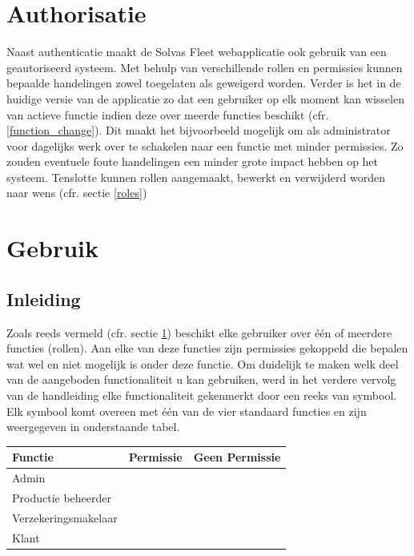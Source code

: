 \documentclass[11pt,openany]{article}
\newcommand{\cmark}{\ding{51}}%
\newcommand{\xmark}{\ding{55}}%
\newcommand{\done}{\rlap{$\square$}{\raisebox{2pt}{\large\hspace{1pt}\cmark}}%
	\hspace{-2.5pt}}
\newcommand{\wontfix}{\rlap{$\square$}{\large\hspace{1pt}\xmark}}
\begin{document}
\newpage
\section{Authorisatie}
 
\label{authorisation}
Naast authenticatie maakt de Solvas Fleet webapplicatie ook gebruik van een geautoriseerd systeem. 
Met behulp van verschillende rollen en permissies kunnen bepaalde handelingen zowel toegelaten als geweigerd worden.
Verder is het in de huidige versie van de applicatie zo dat een gebruiker op elk moment kan wisselen van actieve functie
indien deze over meerde functies beschikt (cfr. \ref{function_change}). Dit maakt het bijvoorbeeld mogelijk om als administrator voor dagelijks werk over te schakelen naar een functie met minder permissies. Zo zouden eventuele foute handelingen een minder
grote impact hebben op het systeem. Tenslotte kunnen rollen aangemaakt, bewerkt en verwijderd worden naar wens (cfr. sectie \ref{roles})
\section{Gebruik}
\subsection{Inleiding}

Zoals reeds vermeld (cfr. sectie \ref{authorisation}) beschikt elke gebruiker over \'{e}\'{e}n of meerdere functies (rollen). Aan elke van
deze functies zijn permissies gekoppeld die bepalen wat wel en niet mogelijk is onder deze functie. Om duidelijk te maken welk deel van de aangeboden functionaliteit u kan gebruiken, werd in het verdere vervolg van de handleiding elke functionaliteit gekenmerkt door een reeks van symbool. Elk symbool komt overeen met \'{e}\'{e}n van de vier standaard functies en zijn weergegeven in onderstaande tabel. 

\begin{table}[]
	\centering
	\label{table1}
	\begin{tabular}{l|l|l}
		\textbf{Functie}     & \textbf{Permissie} & Geen Permissie \\ \hline
		Admin                & \done                 & \wontfix          \\
		Productie beheerder  & \done                 & \wontfix              \\
		Verzekeringsmakelaar & \done                 & \wontfix              \\
		Klant                & \done                 & \wontfix             
	\end{tabular}
\end{table}
\end{document}
